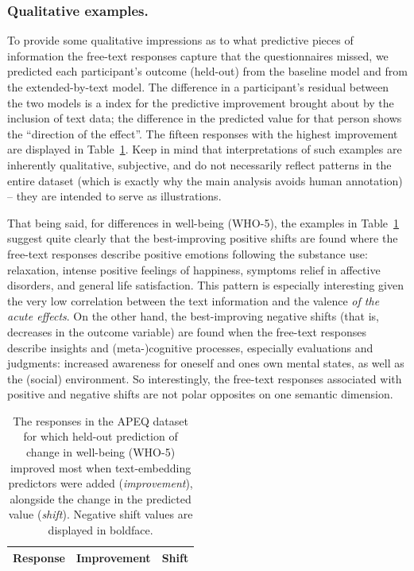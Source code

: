 \documentclass[man,floatsintext]{apa7}
\newcommand{\change}[1]{#1}
\begin{document}
\subsubsection{Qualitative examples.} To provide some qualitative impressions as to what predictive pieces of information the free-text responses capture that the questionnaires missed, we predicted each participant's outcome (\change{held-out}) from the baseline model and from the extended-by-text model. The difference in a participant's residual between the two models is a index for the predictive improvement brought about by the inclusion of text data; the difference in the predicted value for that person shows the ``direction of the effect''. The fifteen responses with the highest improvement are displayed in Table~\ref{tab:examples_APEQ}. Keep in mind that interpretations of such examples are inherently qualitative, subjective, and do not necessarily reflect patterns in the entire dataset (which is exactly why the main analysis avoids human annotation) -- they are intended to serve as illustrations. 

That being said, for differences in well-being (WHO-5), the examples in Table~\ref{tab:examples_APEQ} suggest quite clearly that the best-improving positive shifts are found where the free-text responses describe positive emotions following the substance use: relaxation, intense positive feelings of happiness, symptoms relief in affective disorders,  and general life satisfaction. This pattern is especially interesting given the very low correlation between the text information and the valence \emph{of the acute effects}. On the other hand, the best-improving negative shifts (that is, decreases in the outcome variable)  are found when the free-text responses describe insights and (meta-)cognitive processes, especially evaluations and judgments: increased awareness for oneself and ones own mental states, as well as the (social) environment. So interestingly, the free-text responses associated with positive and negative shifts are not polar opposites on one semantic dimension. 


\begin{table}[!htbp]
\centering
\caption{The  responses in the APEQ dataset for which \change{held-out} prediction of change in well-being (WHO-5) improved most when text-embedding predictors were added (\emph{improvement}), alongside the change in the predicted value (\emph{shift}). Negative shift values are displayed in boldface. } 
\label{tab:examples_APEQ}
\scriptsize
\begin{tabular}{p{12cm}rr}
 \hline
Response & Improvement & Shift \\
  \hline

\end{tabular}
\end{table}
\end{document}
